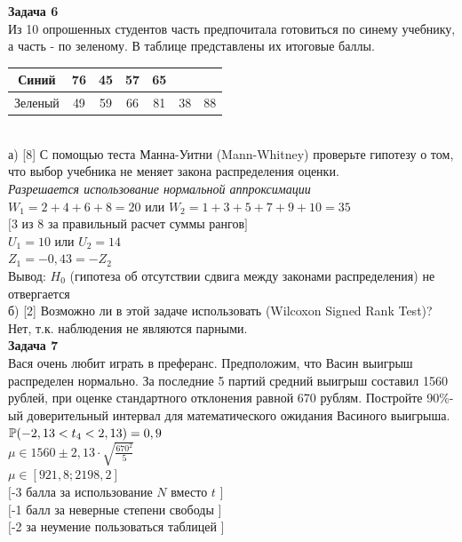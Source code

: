 \documentclass[12pt, a4paper]{article}\usepackage[]{graphicx}\usepackage[]{color}
\begin{document}
{\bf Задача 6} \\
Из 10 опрошенных студентов часть предпочитала готовиться по синему
учебнику, а часть - по зеленому. В таблице представлены их
итоговые баллы.  \\
\begin{tabular}{|c|c|c|c|c|c|c|}
  \hline
  Синий & 76 & 45 & 57 & 65 &  &  \\
  \hline
  Зеленый & 49 & 59 & 66 & 81 & 38 & 88 \\
  \hline
\end{tabular} \\
а) [8] С помощью теста Манна-Уитни (Mann-Whitney) проверьте
гипотезу о
том, что выбор учебника не меняет закона распределения оценки. \\
\emph{Разрешается использование нормальной аппроксимации} \\
$W_{1}=2+4+6+8=20$ или $W_{2}=1+3+5+7+9+10=35$ \\
$[$3 из 8 за правильный расчет суммы рангов$]$ \\
$U_{1}=10$ или $U_{2}=14$ \\
$Z_{1}=-0,43=-Z_{2}$ \\
Вывод: $H_{0}$ (гипотеза об отсутствии сдвига между законами
распределения) не отвергается \\
б) [2] Возможно ли в этой задаче использовать (Wilcoxon Signed Rank Test)? \\
Нет, т.к. наблюдения не являются парными. \\


{\bf Задача 7} \\
Вася очень любит играть в преферанс. Предположим, что Васин
выигрыш распределен нормально. За последние 5 партий средний
выигрыш составил 1560 рублей, при оценке стандартного отклонения
равной 670 рублям. Постройте 90\%-ый доверительный интервал для
математического ожидания Васиного выигрыша. \\
$\P(-2,13<t_{4}<2,13)=0,9$ \\
$\mu \in 1560 \pm 2,13\cdot \sqrt{\frac{670^{2}}{5}}$ \\
$\mu \in [921,8;2198,2]$ \\
$[$-3 балла за использование $N$ вместо $t$ $]$ \\
$[$-1 балл за неверные степени свободы $]$ \\
$[$-2 за неумение пользоваться таблицей $]$ \\
\end{document}
